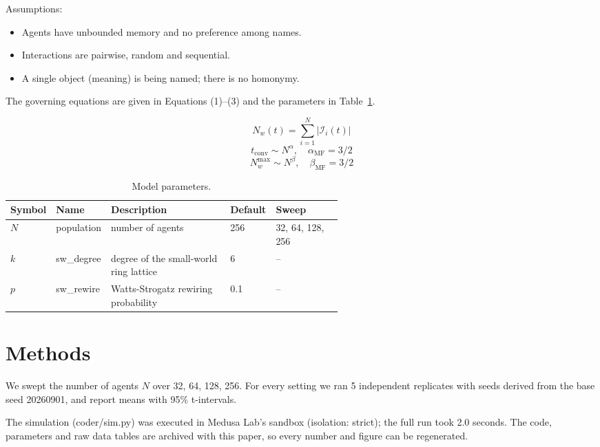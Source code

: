 \documentclass[11pt,a4paper]{article}
\begin{document}
Assumptions:
\begin{itemize}
  \item Agents have unbounded memory and no preference among names.
  \item Interactions are pairwise, random and sequential.
  \item A single object (meaning) is being named; there is no homonymy.
\end{itemize}

The governing equations are given in Equations (1)--(3) and the parameters in Table~\ref{tab:params}.

\begin{equation}\label{eq:1}
N_w(t) = \sum_{i=1}^{N} |\mathcal{I}_i(t)|
\end{equation}
\begin{equation}\label{eq:2}
t_{\mathrm{conv}} \sim N^{\alpha}, \quad \alpha_{\mathrm{MF}} = 3/2
\end{equation}
\begin{equation}\label{eq:3}
N_w^{\max} \sim N^{\beta}, \quad \beta_{\mathrm{MF}} = 3/2
\end{equation}
\begin{table}[ht]
\centering\small
\caption{Model parameters.}\label{tab:params}
\begin{tabular}{l l p{0.36\linewidth} l p{0.2\linewidth}}
\toprule
Symbol & Name & Description & Default & Sweep\\
\midrule
$N$ & population & number of agents & 256 & 32, 64, 128, 256\\
$k$ & sw\_degree & degree of the small-world ring lattice & 6 & --\\
$p$ & sw\_rewire & Watts-Strogatz rewiring probability & 0.1 & --\\
\bottomrule
\end{tabular}
\end{table}
\section{Methods}
We swept the number of agents $N$ over 32, 64, 128, 256. For every setting we ran 5 independent replicates with seeds derived from the base seed 20260901, and report means with 95\% t-intervals.

The simulation (coder/sim.py) was executed in Medusa Lab's sandbox (isolation: strict); the full run took 2.0 seconds. The code, parameters and raw data tables are archived with this paper, so every number and figure can be regenerated.
\end{document}
